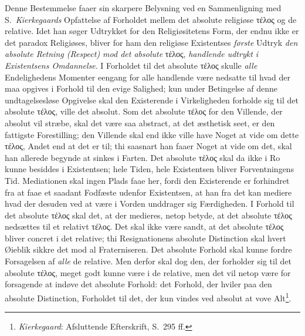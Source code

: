 Denne Bestemmelse faaer sin skarpere Belysning ved en Sammenligning med S.\
\emph{Kierkegaards} Opfattelse af Forholdet mellem det absolute religiøse
τέλος og de relative. Idet han søger Udtrykket for den Religiøsitetens Form,
der endnu ikke er det paradox Religiøses, bliver for ham den religiøse
Existentses \emph{første} Udtryk \emph{den absolute Retning (Respect) mod det
absolute} τέλος, \emph{handlende udtrykt i Existentsens Omdannelse}. I
Forholdet til det absolute τέλος skulle \emph{alle} Endelighedens Momenter
eengang for alle handlende være nedsatte til hvad der maa opgives i Forhold
til den evige Salighed; kun under Betingelse af denne undtagelsesløse
Opgivelse skal den Existerende i Virkeligheden forholde sig til det absolute
τέλος, ville det absolut. Som det absolute τέλος for den Villende, der absolut
vil stræbe, skal det være saa abstract, at det æsthetisk seet, er den
fattigste Forestilling; den Villende skal end ikke ville have Noget at vide om
dette τέλος, Andet end at det er til; thi
 \setcounter{footnote}{0}%
saasnart han faaer Noget at vide om det, skal han allerede begynde at sinkes i
Farten. Det absolute τέλος skal da ikke i Ro kunne besiddes i Existentsen;
hele Tiden, hele Existentsen bliver Forventningens Tid. Mediationen skal ingen
Plads faae her, fordi den Existerende er forhindret fra at faae et saadant
Fodfæste udenfor Existentsen, at han fra det kan mediere hvad der desuden ved
at være i Vorden unddrager sig Færdigheden. I Forhold til det absolute τέλος
skal det, at der medieres, netop betyde, at det absolute τέλος nedsættes til
et relativt τέλος. Det skal ikke være sandt, at det absolute τέλος bliver
concret i det relative; thi Resignationens absolute Distinction skal hvert
Øieblik sikkre det mod al Fraterniseren. Det absolute Forhold skal kunne
fordre Forsagelsen af \emph{alle} de relative. Men derfor skal dog den, der
forholder sig til det absolute τέλος, meget godt kunne være i de relative, men
det vil netop være for forsagende at indøve det absolute Forhold: det Forhold,
der hviler paa den absolute Distinction, Forholdet til det, der kun vindes ved
absolut at vove Alt\footnote{\emph{Kierkegaard}: Afsluttende Efterskrift, S.\
295 ff.}.

